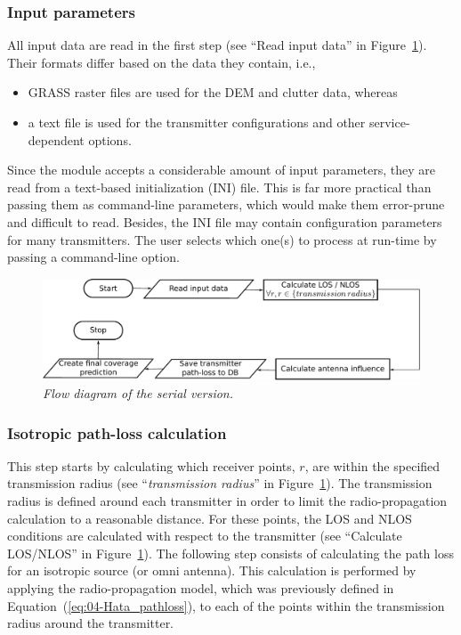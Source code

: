 \subsubsection{Input parameters}

All input data are read in the first step (see ``Read input data''
in Figure~\ref{fig:04-Flow_diagram_serial_version}). Their formats
differ based on the data they contain, i.e.,
\begin{itemize}
\item GRASS raster files are used for the DEM and clutter data, whereas
\item a text file is used for the transmitter configurations and other service-dependent
options.
\end{itemize}
Since the module accepts a considerable amount of input parameters,
they are read from a text-based initialization (INI) file. This is
far more practical than passing them as command-line parameters, which
would make them error-prune and difficult to read. Besides, the INI
file may contain configuration parameters for many transmitters. The
user selects which one(s) to process at run-time by passing a command-line
option.

\begin{figure}
\centering

\includegraphics[width=1\columnwidth]{04-framework_design_and_implementation/img/serial_implementation_flow_diagram}

\caption{\textit{\emph{Flow diagram of the serial version.}}\textit{\label{fig:04-Flow_diagram_serial_version}}}
\end{figure}



\subsubsection{Isotropic path-loss calculation\label{sub:04-Isotrophic_pahloss_calculation}}

This step starts by calculating which receiver points, $r$, are within
the specified transmission radius (see ``\emph{transmission radius}''
in Figure~\ref{fig:04-Flow_diagram_serial_version}). The transmission
radius is defined around each transmitter in order to limit the radio-propagation
calculation to a reasonable distance. For these points, the LOS and
NLOS conditions are calculated with respect to the transmitter (see
``Calculate LOS/NLOS'' in Figure~\ref{fig:04-Flow_diagram_serial_version}).
The following step consists of calculating the path loss for an isotropic
source (or omni antenna). This calculation is performed by applying
the radio-propagation model, which was previously defined in Equation~(\ref{eq:04-Hata_pathloss}),
to each of the points within the transmission radius around the transmitter.

